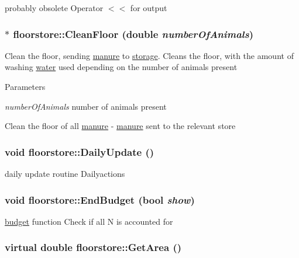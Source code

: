 probably obsolete Operator $<$$<$ for output \hypertarget{classfloorstore_ac45898f14f9fe4c06c43bcd95dc30dfd}{
\subsubsection[{CleanFloor}]{ $\ast$ floorstore::CleanFloor (double {\em numberOfAnimals})}}
\label{classfloorstore_ac45898f14f9fe4c06c43bcd95dc30dfd}


Clean the floor, sending \hyperlink{classmanure}{manure} to \hyperlink{classstorage}{storage}. Cleans the floor, with the amount of washing \hyperlink{classwater}{water} used depending on the number of animals present 
\begin{DoxyParams}{Parameters}
\item[{\em numberOfAnimals}]number of animals present\end{DoxyParams}
Clean the floor of all \hyperlink{classmanure}{manure} -\/ \hyperlink{classmanure}{manure} sent to the relevant store \hypertarget{classfloorstore_a8bb97cc7cc0551e3b726f3d8292090e9}{
\subsubsection[{DailyUpdate}]{\setlength{\rightskip}{0pt plus 5cm}void floorstore::DailyUpdate ()}}
\label{classfloorstore_a8bb97cc7cc0551e3b726f3d8292090e9}


daily update routine Dailyactions \hypertarget{classfloorstore_a159e81c24a93fc32a230461b5e1ef161}{
\subsubsection[{EndBudget}]{\setlength{\rightskip}{0pt plus 5cm}void floorstore::EndBudget (bool {\em show})}}
\label{classfloorstore_a159e81c24a93fc32a230461b5e1ef161}


\hyperlink{classbudget}{budget} function Check if all N is accounted for \hypertarget{classfloorstore_a0b3cedc553507a2a14ba4e3bbc4bc850}{
\subsubsection[{GetArea}]{\setlength{\rightskip}{0pt plus 5cm}virtual double floorstore::GetArea ()}}
\label{classfloorstore_a0b3cedc553507a2a14ba4e3bbc4bc850}


